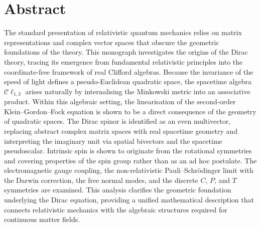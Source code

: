 \chapter*{Abstract}

The standard presentation of relativistic quantum mechanics relies on matrix
representations and complex vector spaces that obscure the geometric
foundations of the theory.
This monograph investigates the origins of the Dirac theory, tracing its
emergence from fundamental relativistic principles into the coordinate-free
framework of real Clifford algebras.
Because the invariance of the speed of light defines a pseudo-Euclidean
quadratic space, the spacetime algebra $\mathcal{C}\ell_{1,3}$ arises naturally
by internalising the Minkowski metric into an associative product.
Within this algebraic setting, the linearisation of the second-order
Klein--Gordon--Fock equation is shown to be a direct consequence of the geometry
of quadratic spaces.
The Dirac spinor is identified as an even multivector, replacing abstract
complex matrix spaces with real spacetime geometry and interpreting the
imaginary unit via spatial bivectors and the spacetime pseudoscalar.
Intrinsic spin is shown to originate from the rotational symmetries and covering
properties of the spin group rather than as an ad hoc postulate.
The electromagnetic gauge coupling, the non-relativistic Pauli--Schrödinger limit
with the Darwin correction, the free normal modes, and the discrete $C$, $P$,
and $T$ symmetries are examined.
This analysis clarifies the geometric foundation underlying the Dirac equation,
providing a unified mathematical description that connects relativistic
mechanics with the algebraic structures required for continuous matter fields.
